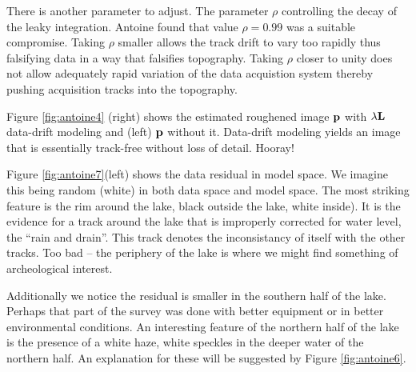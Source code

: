 \par
There is another parameter to adjust.
The parameter $\rho$ controlling the decay of the leaky integration. 
Antoine found that value ${\rho=0.99}$ was a suitable compromise.
Taking $\rho$ smaller allows the track drift to vary too rapidly thus
falsifying data in a way that falsifies topography.
Taking $\rho$ closer to unity does not allow adequately rapid variation
of the data acquistion system
thereby pushing acquisition tracks into the topography.

\par
Figure \ref{fig:antoine4}
(right)
shows the estimated roughened image ${\bf p}$
with $\lambda\bold L$ data-drift modeling and
(left) ${\bf p}$ without it.
Data-drift modeling yields an image that is essentially track-free
without loss of detail.  Hooray!
\par
{}


\par
Figure \ref{fig:antoine7}(left) shows the data residual in model space.
We imagine this being random (white) in both data space and model space.
The most striking feature is the rim around the lake,
black outside the lake, white inside).   It is the evidence for
a track around the lake that is improperly corrected for water level,
the ``rain and drain''.  This track denotes the inconsistancy of
itself with the other tracks.
Too bad -- the periphery of the lake is where we might find
something of archeological interest.


\par
Additionally we notice the residual is smaller in the southern half of the lake.
Perhaps that part of the survey was done with better equipment
or in better environmental conditions.
An interesting feature of the northern half of the lake
is the presence of a white haze, white speckles
in the deeper water of the northern half.
An explanation for these will be suggested by Figure \ref{fig:antoine6}.

